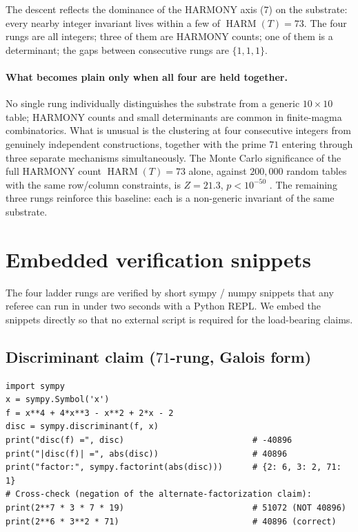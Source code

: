 \documentclass[11pt,reqno]{amsart}
\theoremstyle{definition}
\DeclareMathOperator{\HARM}{HARM}
\begin{document}
The descent reflects the dominance of the HARMONY axis ($7$) on the
substrate: every nearby integer invariant lives within a few of
$\HARM(T) = 73$. The four rungs are all integers; three of them are
HARMONY counts; one of them is a determinant; the gaps between
consecutive rungs are $\{1, 1, 1\}$.

\paragraph{What becomes plain only when all four are held together.}

No single rung individually distinguishes the substrate from a
generic $10 \times 10$ table; HARMONY counts and small determinants
are common in finite-magma combinatorics. What is unusual is the
clustering at four consecutive integers from genuinely independent
constructions, together with the prime $71$ entering through three
separate mechanisms simultaneously. The Monte Carlo significance of
the full HARMONY count $\HARM(T) = 73$ alone, against $200{,}000$
random tables with the same row/column constraints, is
$Z = 21.3$, $p < 10^{-50}$ \cite{Sanders2026CLAxioms}. The remaining
three rungs reinforce this baseline: each is a non-generic invariant
of the same substrate.

\section{Embedded verification snippets}
\label{sec:verification-snippet}

The four ladder rungs are verified by short sympy / numpy snippets
that any referee can run in under two seconds with a Python REPL.
We embed the snippets directly so that no external script is required
for the load-bearing claims.

\subsection{Discriminant claim ($71$-rung, Galois form)}
\label{subsec:disc-snippet}

\begin{lstlisting}[style=plainpy]
import sympy
x = sympy.Symbol('x')
f = x**4 + 4*x**3 - x**2 + 2*x - 2
disc = sympy.discriminant(f, x)
print("disc(f) =", disc)                          # -40896
print("|disc(f)| =", abs(disc))                   # 40896
print("factor:", sympy.factorint(abs(disc)))      # {2: 6, 3: 2, 71: 1}
# Cross-check (negation of the alternate-factorization claim):
print(2**7 * 3 * 7 * 19)                          # 51072 (NOT 40896)
print(2**6 * 3**2 * 71)                           # 40896 (correct)
\end{lstlisting}
\end{document}
